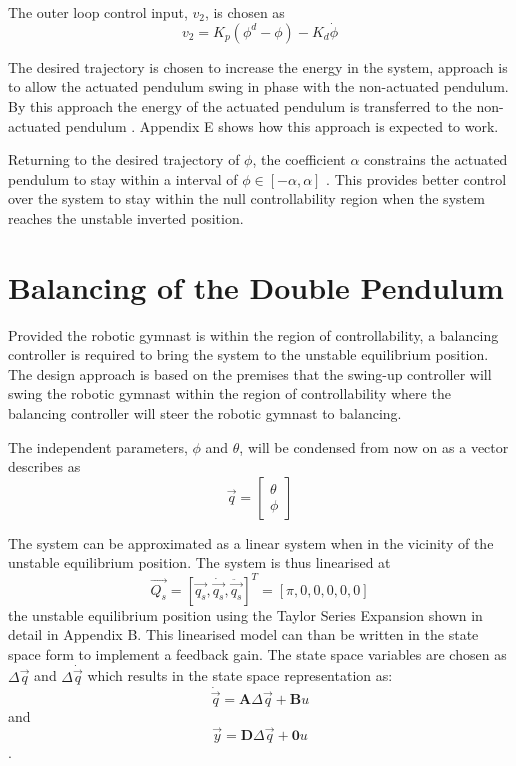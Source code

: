 \documentclass[a4paper,12pt]{article}
\begin{document}
	The outer loop control input, $v_{2}$, is chosen as 
	\begin{equation} \label{eq:v2}
	v_{2} = K_{p}(\phi^{d}-\phi)-K_{d}\dot{\phi}
	\end{equation}
	
	The desired trajectory is chosen to increase the energy in the system, approach is to allow the actuated pendulum swing in phase with the non-actuated pendulum. By this approach the energy of the actuated pendulum is transferred to the non-actuated pendulum \cite{spong_swingup}. Appendix E shows how this approach is expected to work.
	
	Returning to the desired trajectory of $\phi$, the coefficient $\alpha$ constrains the actuated pendulum to stay within a interval of $ \phi \in [-\alpha,\alpha] $ \cite{spong_swingup}. This provides better control over the system to stay within the null controllability region when the system reaches the unstable inverted position.
	
		  
	\section{Balancing of the Double Pendulum}
	
	Provided the robotic gymnast is within the region of controllability, a balancing controller is required to bring the system to the unstable equilibrium position. The design approach is based on the premises that the swing-up controller will swing the robotic gymnast within the region of controllability where the balancing controller will steer the robotic gymnast to balancing.
	
	The independent parameters, $\phi$ and $\theta$, will be condensed from now on as a vector describes as $$ \vec{q} = 
	\begin{bmatrix}
	\theta \\
	\phi
	\end{bmatrix}
	$$
	
	The system can be approximated as a linear system when in the vicinity of the unstable equilibrium position. The system is thus linearised at $$\vec{Q_{s}} = [\vec{q_{s}},\dot{\vec{q_{s}}},\ddot{\vec{q_{s}}}]^{T}=[\pi,0,0,0,0,0]$$ the unstable equilibrium position using the Taylor Series Expansion shown in detail in Appendix B. This linearised model can than be written in the state space form to implement a feedback gain. The state space variables are chosen as $\Delta{\vec{q}}$ and $\Delta{\dot{\vec{q}}}$ which results in the state space representation as:  $$ \dot{\vec{q}} = \boldsymbol{A}\Delta{\vec{q}} + \boldsymbol{B}u $$ and $$ \vec{y} = \boldsymbol{D}\Delta{\vec{q}} + \boldsymbol{0}u $$.
	
\end{document}
